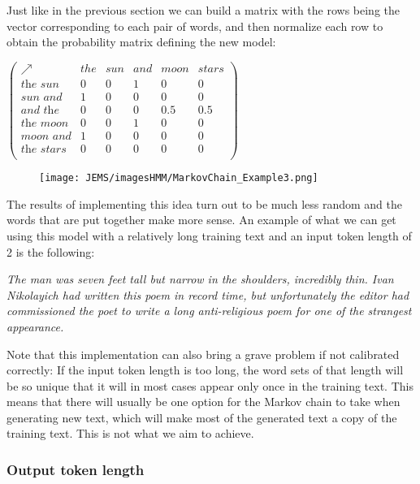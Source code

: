 \documentclass[12pt]{article}
\numberwithin{equation}{section}
\begin{document}
Just like in the previous section we can build a matrix with the rows being the vector corresponding to each pair of words, and then normalize each row to obtain the probability matrix defining the new model:

\begin{center}
$\begin{pmatrix}
\nearrow & the & sun & and & moon & stars \\
\textit{the sun} & 0 & 0 & 1 & 0 & 0 \\
\textit{sun and} & 1 & 0 & 0 & 0 & 0 \\
\textit{and the} & 0 & 0 & 0 & 0.5 & 0.5 \\
\textit{the moon} & 0 & 0 & 1 & 0 & 0 \\
\textit{moon and} & 1 & 0 & 0 & 0 & 0 \\
\textit{the stars} & 0 & 0 & 0 & 0 & 0 \\
\end{pmatrix}$
\end{center}

\begin{figure}[H]
\begin{center}
    \texttt{[image: JEMS/imagesHMM/MarkovChain\_Example3.png]}
\end{center}
\end{figure}

The results of implementing this idea turn out to be much less random and the words that are put together make more sense. An example of what we can get using this model with a relatively long training text and an input token length of 2 is the following:

\textit{The man was seven feet tall but narrow in the shoulders, incredibly thin. Ivan Nikolayich had written this poem in record time, but unfortunately the editor had commissioned the poet to write a long anti-religious poem for one of the strangest appearance.}

\bigskip

Note that this implementation can also bring a grave problem if not calibrated correctly: If the input token length is too long, the word sets of that length will be so unique that it will in most cases appear only once in the training text. This means that there will usually be one option for the Markov chain to take when generating new text, which will make most of the generated text a copy of the training text. This is not what we aim to achieve.


\subsubsection{Output token length}
\end{document}
